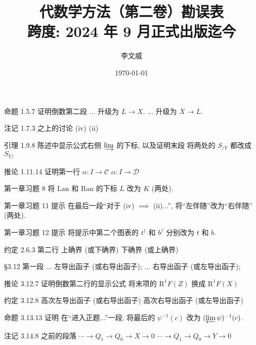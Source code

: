 \documentclass{AJerrata}
\title{\bfseries 代数学方法（第二卷）勘误表 \\ 跨度: 2024 年 9 月正式出版迄今 }
\author{李文威}
\date{\today}
\begin{document}
	\maketitle

	\begin{Errata}
		\item[命题 1.5.7 证明倒数第二段]
		\Orig ... 升级为 $L \to X$.
		\Corr ... 升级为 $X \to L$.
		
		\item[注记 1.7.3 之上的讨论]
		\Orig (iv)
		\Corr (ii)
		
		\item[引理 1.9.8 陈述中显示公式右侧 $\varinjlim$ 的下标, 以及证明末段]
		将两处的 $S_{/Y}$ 都改成 $S_{Y/}$
		
		\item[推论 1.11.14 证明第一行]
		\Orig $\alpha: I \to \mathcal{C}$
		\Corr $\alpha: I \to \mathcal{D}$
		
		\item[第一章习题 8]
		将 $\mathrm{Lan}$ 和 $\mathrm{Ran}$ 的下标 $L$ 改为 $K$ (两处).
		
		\item[第一章习题 11 提示] 在最后一段``对于 (iv) $\implies$ (ii)...'', 将``左伴随''改为``右伴随'' (两处).
		
		\item[第一章习题 12 提示] 将提示中第二个图表的 $t^\dagger$ 和 $b^\dagger$ 分别改为 $t$ 和 $b$.
		
		\item[约定 2.6.3 第二行]
		\Orig 上确界 (或下确界)
		\Corr 下确界 (或上确界)
		
		\item[\S 3.12 第一段]
		\Orig ... 左导出函子 (或右导出函子);
		\Corr ... 右导出函子 (或左导出函子);
		
		\item[推论 3.12.7 证明倒数第二行的显示公式]
		将末项的 $\mathrm{R}^1 F(Z)$ 换成 $\mathrm{R}^1 F(X)$
		
		\item[约定 3.12.8]
		\Orig 高次左导出函子 (或右导出函子)
		\Corr 高次右导出函子 (或左导出函子)
		
		\item[命题 3.13.13 证明]
		在``进入正题...''一段, 将最后的 $\psi^{-1}(c)$ 改为 $(\varprojlim \psi)^{-1}(c)$.
		
		\item[注记 3.14.8 之前的段落]
		\Orig $\cdots \to Q_1 \to Q_0 \to X \to 0$
		\Corr $\cdots \to Q_1 \to Q_0 \to Y \to 0$
		

\end{Errata}
\end{document}
